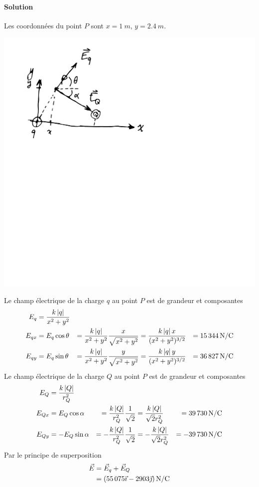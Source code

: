 \paragraph{Solution}
  Les coordonnées du point $P$ sont $x = \SI{1}{m}$, $y = \SI{2.4}{m}$.
  \begin{center}
    \includegraphics[scale=0.5]{02-champ-electrique/figures/champ-deux-charges-soln.pdf}
  \end{center}
  Le champ électrique de la charge $q$ au point $P$ est de grandeur et
  composantes
  \begin{align*}
    E_q &= \frac{k\abs{q}}{x^2 + y^2} \\
    E_{qx} &= E_q \cos \theta
        &= \frac{k\abs{q}}{x^2 + y^2} \frac{x}{\sqrt{x^2 + y^2}}
        &= \frac{k\abs{q}x}{(x^2 + y^2)^{3/2}}
        &= \SI{15344}{N/C} \\
    E_{qy} &= E_q \sin \theta
        &= \frac{k\abs{q}}{x^2 + y^2} \frac{y}{\sqrt{x^2 + y^2}}
        &= \frac{k\abs{q}y}{(x^2 + y^2)^{3/2}}
        &= \SI{36827}{N/C} \\
  \end{align*}
  Le champ électrique de la charge $Q$ au point $P$ est de grandeur et
  composantes
  \begin{align*}
    E_Q &= \frac{k\abs{Q}}{r_Q^2} \\
    E_{Qx} &= E_Q \cos \alpha
        &= \frac{k\abs{Q}}{r_Q^2} \frac{1}{\sqrt{2}}
        &= \frac{k\abs{Q}}{\sqrt{2}r_Q^2}
        &= \SI{39730}{N/C} \\
    E_{Qy} &= -E_Q \sin \alpha
        &= -\frac{k\abs{Q}}{r_Q^2} \frac{1}{\sqrt{2}}
        &= -\frac{k\abs{Q}}{\sqrt{2}r_Q^2}
        &= \SI{-39730}{N/C} \\
  \end{align*}
  Par le principe de superposition
  \begin{align*}
    \vE &= \vE_q + \vE_Q  \\
        &= \left(\num{55075}\xhat - \num{2903}\yhat\right) \si{N/C}
  \end{align*}



